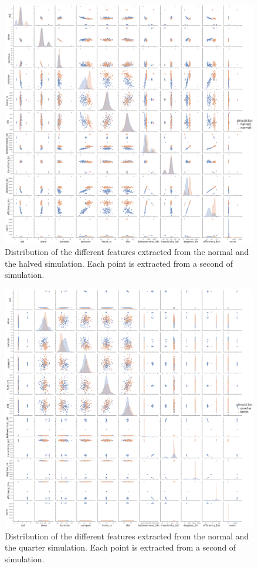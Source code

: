 \begin{figure}
  \centering
  \includegraphics[width=\textwidth]{normal-halved-feature-distribution}
  \caption{Distribution of the different features extracted from the normal and the halved simulation. Each point is extracted from a second of simulation.}
  \label{fig:normal-halved-feature-distribution}
\end{figure}

\begin{figure}
  \centering
  \includegraphics[width=\textwidth]{normal-quarter-feature-distribution}
  \caption{Distribution of the different features extracted from the normal and the quarter simulation. Each point is extracted from a second of simulation.}
  \label{fig:normal-quarter-feature-distribution}
\end{figure}


